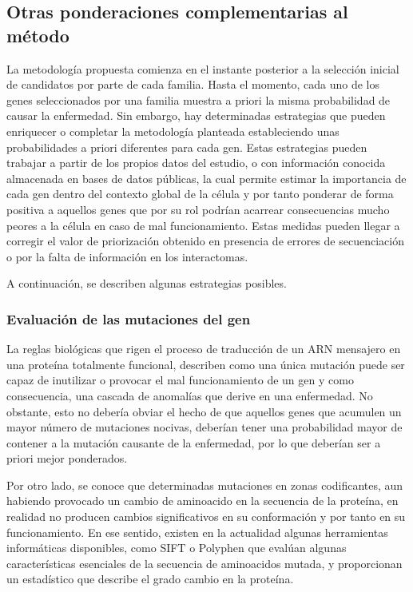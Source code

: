 \subsection{Otras ponderaciones complementarias al método}
	
La metodología propuesta comienza en el instante posterior a la selección inicial de candidatos por parte de cada familia. Hasta el momento, cada uno de los genes seleccionados por una familia muestra a priori la misma probabilidad de causar la enfermedad. Sin embargo, hay determinadas estrategias que pueden enriquecer o completar la metodología planteada estableciendo unas probabilidades a priori diferentes para cada gen. Estas estrategias pueden trabajar a partir de los propios datos del estudio, o con información conocida almacenada en bases de datos públicas, la cual permite estimar la importancia de cada gen dentro del contexto global de la célula y por tanto ponderar de forma positiva a aquellos genes que por su rol podrían acarrear consecuencias mucho peores a la célula en caso de mal funcionamiento. Estas medidas pueden llegar a corregir el valor de priorización obtenido en presencia de errores de secuenciación o por la falta de información en los interactomas.

\medskip
A continuación, se describen algunas estrategias posibles.

\subsubsection{Evaluación de las mutaciones del gen}
   
La reglas biológicas que rigen el proceso de traducción de un ARN mensajero en una proteína totalmente funcional, describen como una única mutación puede ser capaz de inutilizar o provocar el mal funcionamiento de un gen y como consecuencia, una cascada de anomalías que derive en una enfermedad. No obstante, esto no debería obviar el hecho de que aquellos genes que acumulen un mayor número de mutaciones nocivas, deberían tener una probabilidad mayor de contener a la mutación causante de la enfermedad, por lo que deberían ser a priori mejor ponderados.

\medskip
Por otro lado, se conoce que determinadas mutaciones en zonas codificantes, aun habiendo provocado un cambio de aminoacido en la secuencia de la proteína, en realidad no producen cambios significativos en su conformación y por tanto en su funcionamiento. En ese sentido, existen en la actualidad algunas herramientas informáticas disponibles, como SIFT \cite{sift} o Polyphen \cite{polyphen} que evalúan algunas características esenciales de la secuencia de aminoacidos mutada, y proporcionan un estadístico que describe el grado cambio en la proteína.


